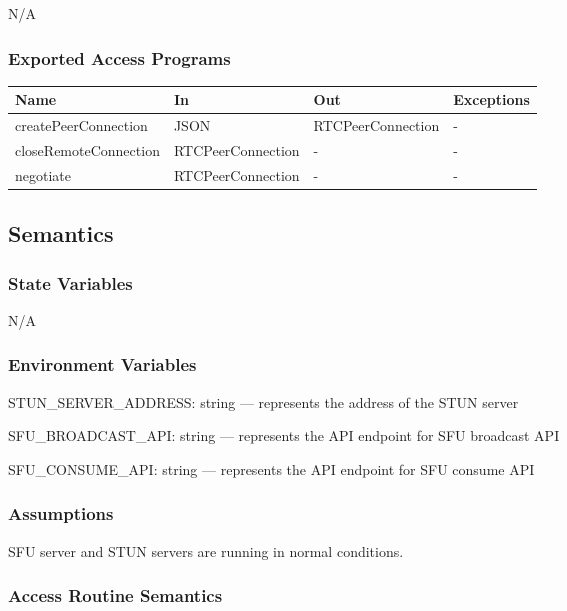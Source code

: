 \documentclass[12pt, titlepage]{article}
\begin{document}
N/A

\subsubsection{Exported Access Programs}

\begin{center}
  \begin{tabular}{p{4cm} p{4cm} p{4cm} p{2cm}}
    \hline
    \textbf{Name}               & \textbf{In}             & \textbf{Out}            & \textbf{Exceptions} \\
    \hline
    createPeerConnection  & JSON              & RTCPeerConnection & -             \\
    closeRemoteConnection & RTCPeerConnection & -                 & -             \\
    negotiate             & RTCPeerConnection & -                 & -             \\
    \hline
  \end{tabular}
\end{center}

\subsection{Semantics}

\subsubsection{State Variables}

N/A

\subsubsection{Environment Variables}

\noindent STUN\_SERVER\_ADDRESS: string --- represents the address of the STUN server

\noindent SFU\_BROADCAST\_API: string --- represents the API endpoint for SFU broadcast API

\noindent SFU\_CONSUME\_API: string --- represents the API endpoint for SFU consume API

\subsubsection{Assumptions}

SFU server and STUN servers are running in normal conditions.

\subsubsection{Access Routine Semantics}
\end{document}
